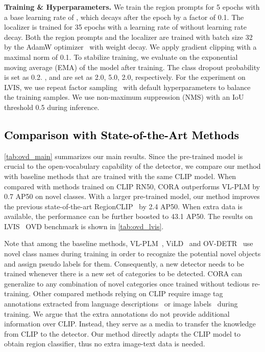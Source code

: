 \documentclass[10pt,twocolumn,letterpaper]{article}
\begin{document}
\noindent\textbf{Training \& Hyperparameters.}
We train the region prompts for 5 epochs with a base learning rate of , which decays after the  epoch by a factor of 0.1. 
The localizer is trained for 35 epochs with a learning rate of  without learning rate decay. 
Both the region prompts and the localizer are trained with batch size 32 by the AdamW optimizer~\cite{adamw} with  weight decay. 
We apply gradient clipping with a maximal norm of 0.1. 
To stabilize training, we evaluate on the exponential moving average (EMA) of the model after training. 
The class dropout probability  is set as 0.2. 
,  and  are set as 2.0, 5.0, 2.0,  respectively.
For the experiment on LVIS, we use repeat factor sampling~\cite{LVIS} with default hyperparameters to balance the training samples.
We use non-maximum suppression (NMS) with an IoU threshold 0.5 during inference.  

\subsection{\textcolor{black}{Comparison with State-of-the-Art Methods}}
\label{sec:sotas}

\cref{tab:ovd_main} summarizes our main results. 
Since the pre-trained model is crucial to the open-vocabulary capability of the detector, we compare our method with baseline methods that are trained with the same CLIP model.
When compared with methods trained on CLIP RN50, CORA outperforms VL-PLM by 0.7 AP50 on novel classes.
With a larger pre-trained model, our method improves the previous state-of-the-art RegionCLIP~\cite{regionclip} by 2.4 AP50.
When extra data is available, the performance can be further boosted to 43.1 AP50.
The results on LVIS~\cite{LVIS} OVD benchmark is shown in \cref{tab:ovd_lvis}.




Note that among the baseline methods, VL-PLM~\cite{vlplm}, ViLD~\cite{vild} and OV-DETR~\cite{OVDETR} use novel class names during training in order to recognize the potential novel objects and assign pseudo labels for them. Consequently, a new detector needs to be trained whenever there is a new set of categories to be detected.
CORA can generalize to any combination of novel categories once trained without tedious re-training.
Other compared methods relying on CLIP require image tag annotations extracted from language descriptions~\cite{medet, bridging, regionclip} or image labels~\cite{detic} during training.
We argue that the extra annotations do not provide additional information over CLIP.
Instead, they serve as a media to transfer the knowledge from CLIP to the detector.
Our method directly adapts the CLIP model to obtain region classifier, thus no extra image-text data is needed.
\end{document}
